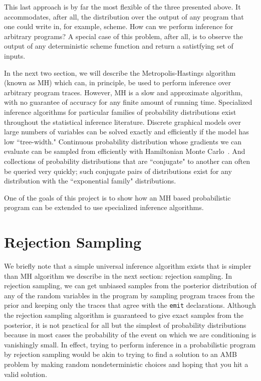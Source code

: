 \documentclass{article}
\begin{document}
This last approach is by far the most flexible of the three presented above. It
accommodates, after all, the distribution over the output of any program that one
could write in, for example, scheme. How can we perform inference for arbitrary
programs? A special case of this problem, after all, is to observe the output of
any deterministic scheme function and return a satistfying set of inputs.

In the next two section, we will describe the Metropolis-Hastings algorithm
(known as MH) which can, in principle, be used to perform inference over
arbitrary program traces. However, MH is a slow and approximate algorithm, with
no guarantee of accuracy for any finite amount of running time. Specialized
inference algorithms for particular families of probability distributions exist
throughout the statistical inference literature. Discrete graphical models over
large numbers of variables can be solved exactly and efficiently if the model
has low ``tree-width." Continuous probability distribution whose gradients we can
evaluate can be sampled from efficiently with Hamiltonian Monte Carlo~\cite{duane1987hybrid}.
And collections of probability distributions that are ``conjugate" to another
can often be queried very quickly; such conjugate pairs of distributions exist
for any distribution with the ``exponential family" distributions.

One of the goals of this project is to show how an MH based probabilistic
program can be extended to use specialized inference algorithms. 

\section{Rejection Sampling}
We briefly note that a simple universal inference algorithm exists that is
simpler than MH algorithm we describe in the next section: rejection sampling.
In rejection sampling, we can get unbiased samples from the posterior
distribution of any of the random variables in the program by sampling program
traces from the prior and keeping only the traces that agree with the
\verb+emit+ declarations. Although the rejection sampling algorithm is
guaranteed to give exact samples from the posterior, it is not practical for
all but the simplest of probability  distributions because in most cases the
probability of the event on which we are conditioning is vanishingly small. In
effect, trying to perform inference in a probabilistic program by rejection
sampling would be akin to trying to find a solution to an AMB problem by making
random nondeterministic choices and hoping that you hit a valid solution.
\end{document}
